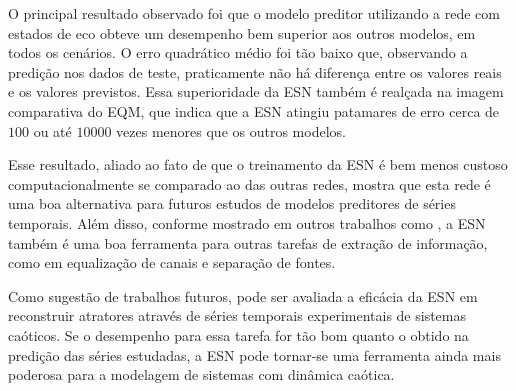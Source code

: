 \documentclass[a4paper, 12pt]{article}
\begin{document}
O principal resultado observado foi que o modelo preditor utilizando a rede com estados de eco obteve um desempenho bem superior aos outros modelos, em todos os cenários. O erro quadrático médio foi tão baixo que, observando a predição nos dados de teste, praticamente não há diferença entre os valores reais e os valores previstos. Essa superioridade da ESN também é realçada na imagem  comparativa do EQM, que indica que a ESN  atingiu patamares de erro cerca de $100$ ou até $10000$ vezes menores que os outros modelos. 

Esse resultado, aliado ao fato de que o treinamento da ESN é bem menos custoso computacionalmente se comparado ao das outras redes, mostra que esta rede é uma boa alternativa para futuros estudos de modelos preditores de séries temporais. Além disso, conforme mostrado em outros trabalhos como \cite{jaeger2004harnessing, jaeger2007echo, boccato2013novas}, a ESN também é uma boa ferramenta para outras tarefas de extração de informação, como em equalização de canais e separação de fontes. 

Como sugestão de trabalhos futuros, pode ser avaliada a eficácia da ESN em reconstruir atratores através de séries temporais experimentais de sistemas caóticos. Se o desempenho para essa tarefa for tão bom quanto o obtido na predição das séries estudadas, a ESN pode tornar-se uma ferramenta ainda mais poderosa para a modelagem de sistemas com dinâmica caótica.



{\footnotesize }

\end{document}
